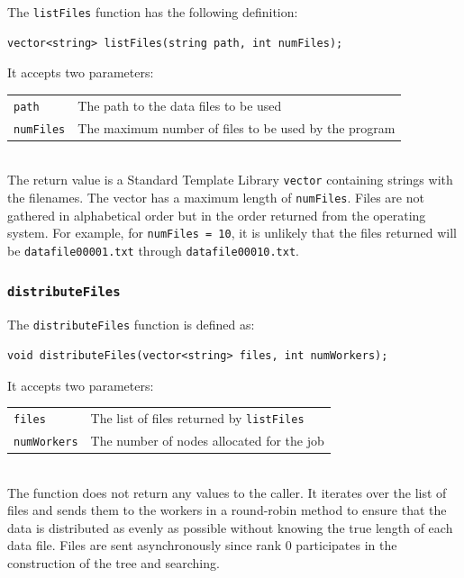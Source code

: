 \documentclass{article}
\begin{document}
The \texttt{listFiles} function has the following definition:

\lstset{language=C++, keepspaces=true}
\begin{lstlisting}
vector<string> listFiles(string path, int numFiles); 
\end{lstlisting}

It accepts two parameters: \\

\begin{tabular}{l l}
\texttt{path} & The path to the data files to be used \\
\texttt{numFiles} & The maximum number of files to be used by the program \\
\end{tabular}\\

The return value is a Standard Template Library \texttt{vector} containing strings with the filenames. The vector has a maximum length of \texttt{numFiles}. Files are not gathered in alphabetical order but in the order returned from the operating system. For example, for \texttt{numFiles = 10}, it is unlikely that the files returned will be \texttt{datafile00001.txt} through \texttt{datafile00010.txt}.


%
%

\subsubsection{\texttt{distributeFiles}}\label{sec:distributefiles}

The \texttt{distributeFiles} function is defined as:

\lstset{language=C++, keepspaces=true}
\begin{lstlisting}
void distributeFiles(vector<string> files, int numWorkers);
\end{lstlisting}

It accepts two parameters: \\

\begin{tabular}{l l}
\texttt{files} & The list of files returned by \texttt{listFiles} \\
\texttt{numWorkers} & The number of nodes allocated for the job \\
\end{tabular} \\

The function does not return any values to the caller. It iterates over the list of files and sends them to the workers in a round-robin method to ensure that the data is distributed as evenly as possible without knowing the true length of each data file. Files are sent asynchronously since rank 0 participates in the construction of the tree and searching.
\end{document}
